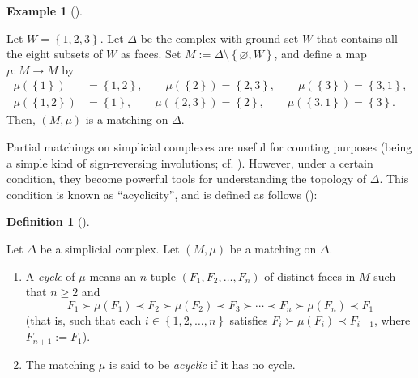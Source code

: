 \documentclass[numbers=enddot,12pt,final,onecolumn,notitlepage]{scrartcl}%
\theoremstyle{definition}
\newtheorem{defi}[theo]{Definition}
\newenvironment{definition}[1][]
{\begin{defi}[#1]\begin{leftbar}}
{\end{leftbar}\end{defi}}
\newtheorem{exam}[theo]{Example}
\newenvironment{example}[1][]
{\begin{exam}[#1]\begin{leftbar}}
{\end{leftbar}\end{exam}}
\begin{document}
\begin{example}
\label{exa.parmat.0} Let $W=\left\{  1,2,3\right\}  $. Let $\Delta$ be the
complex with ground set $W$ that contains all the eight subsets of $W$ as
faces. Set $M:=\Delta\setminus\left\{  \varnothing,W\right\}  $, and define a
map $\mu:M\rightarrow M$ by%
\begin{align*}
\mu\left(  \left\{  1\right\}  \right)   &  =\left\{  1,2\right\}  ,\qquad
\mu\left(  \left\{  2\right\}  \right)  =\left\{  2,3\right\}  ,\qquad
\mu\left(  \left\{  3\right\}  \right)  =\left\{  3,1\right\}  ,\\
\mu\left(  \left\{  1,2\right\}  \right)   &  =\left\{  1\right\}  ,\qquad
\mu\left(  \left\{  2,3\right\}  \right)  =\left\{  2\right\}  ,\qquad
\mu\left(  \left\{  3,1\right\}  \right)  =\left\{  3\right\}  .
\end{align*}
Then, $\left(  M,\mu\right)  $ is a matching on $\Delta$.
\end{example}

Partial matchings on simplicial complexes are useful for counting purposes
(being a simple kind of sign-reversing involutions; cf. \cite[Chapter
2]{Sagan19}). However, under a certain condition, they become powerful tools
for understanding the topology of $\Delta$. This condition is known as
\textquotedblleft acyclicity\textquotedblright, and is defined as follows
(\cite[Definition 10.7]{Kozlov20}):

\begin{definition}
Let $\Delta$ be a simplicial complex. Let $\left(  M,\mu\right)  $ be a
matching on $\Delta$.

\begin{enumerate}
\item[\textbf{(a)}] A \emph{cycle} of $\mu$ means an $n$-tuple $\left(
F_{1},F_{2},\ldots,F_{n}\right)  $ of distinct faces in $M$ such that $n\geq2$
and%
\[
F_{1}\succ\mu\left(  F_{1}\right)  \prec F_{2}\succ\mu\left(  F_{2}\right)
\prec F_{3}\succ\cdots\prec F_{n}\succ\mu\left(  F_{n}\right)  \prec F_{1}%
\]
(that is, such that each $i\in\left\{  1,2,\ldots,n\right\}  $ satisfies
$F_{i}\succ\mu\left(  F_{i}\right)  \prec F_{i+1}$, where $F_{n+1}:=F_{1}$).

\item[\textbf{(b)}] The matching $\mu$ is said to be \emph{acyclic} if it has
no cycle.
\end{enumerate}
\end{definition}
\end{document}
